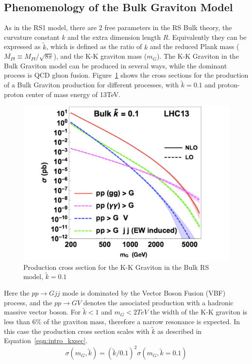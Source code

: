 \subsection{Phenomenology of the Bulk Graviton Model}
As in the RS1 model, there are 2 free parameters in the RS Bulk theory, the curvature constant $k$ and the extra dimension length $R$. Equivalently they can be expressed as $\tilde{k}$, which is defined as the ratio of $k$ and the reduced Plank mass ($\overline{M_{Pl}}\equiv M_{Pl}/\sqrt{8\pi}$), and the K-K graviton mass ($m_{G}$). The K-K Graviton in the Bulk Graviton model can be produced in several ways, while the dominant process is QCD gluon fusion. Figure~\ref{fig:intro_Gxsec} shows the cross sections for the production of a Bulk Graviton production for different processes, with $\tilde{k}=0.1$ and proton-proton center of mass energy of 13TeV.
\begin{figure}[htbp]
\begin{center}
\includegraphics[width=0.5\linewidth]{figures/intro_Gxsec.pdf}
\caption{Production cross section for the K-K Graviton in the Bulk RS model, $\tilde{k}=0.1$}
\label{fig:intro_Gxsec}
\end{center}
\end{figure}
Here the $pp\rightarrow Gjj$ mode is dominated by the Vector Boson Fusion (VBF) process, and the $pp\rightarrow GV$ denotes the associated production with a hadronic massive vector boson. For $\tilde{k}<1$ and $m_{G}<2 TeV$ the width of the K-K graviton is less than 6\% of the graviton mass, therefore a narrow resonance is expected. In this case the production cross section scales with $\tilde{k}$ as described in Equation~\ref{eqn:intro_kxsec}.
\begin{equation}
\sigma (m_G,\tilde{k}) = (\tilde{k}/0.1)^2 \sigma (m_G,\tilde{k}=0.1)
\label{eqn:intro_kxsec}
\end{equation}

